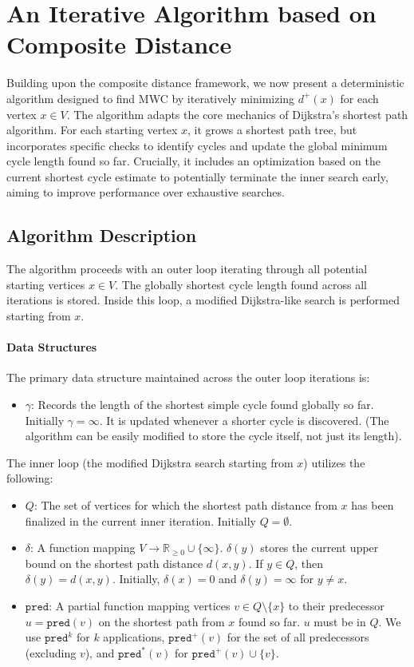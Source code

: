 \documentclass{article}
\begin{document}
\section{An Iterative Algorithm based on Composite Distance}
\label{sec_alg} %

Building upon the composite distance framework, we now present a deterministic algorithm designed to find MWC by iteratively minimizing $d^+(x)$ for each vertex $x \in V$. The algorithm adapts the core mechanics of Dijkstra's shortest path algorithm. For each starting vertex $x$, it grows a shortest path tree, but incorporates specific checks to identify cycles and update the global minimum cycle length found so far. Crucially, it includes an optimization based on the current shortest cycle estimate to potentially terminate the inner search early, aiming to improve performance over exhaustive searches.

\subsection{Algorithm Description}
\label{subsec:algo_desc}
The algorithm proceeds with an outer loop iterating through all potential starting vertices $x \in V$. The globally shortest cycle length found across all iterations is stored. Inside this loop, a modified Dijkstra-like search is performed starting from $x$.

\paragraph{Data Structures} The primary data structure maintained across the outer loop iterations is:
\begin{itemize}
    \item $\gamma$: Records the length of the shortest simple cycle found globally so far. Initially $\gamma = \infty$. It is updated whenever a shorter cycle is discovered. (The algorithm can be easily modified to store the cycle itself, not just its length).
\end{itemize}
The inner loop (the modified Dijkstra search starting from $x$) utilizes the following:
\begin{itemize}
    \item $Q$: The set of vertices for which the shortest path distance from $x$ has been finalized in the current inner iteration. Initially $Q = \emptyset$.
    \item $\delta$: A function mapping $V \to \mathbb{R}_{\ge 0} \cup \{\infty\}$. $\delta(y)$ stores the current upper bound on the shortest path distance $d(x,y)$. If $y \in Q$, then $\delta(y) = d(x,y)$. Initially, $\delta(x) = 0$ and $\delta(y) = \infty$ for $y \neq x$.
    \item $\texttt{pred}$: A partial function mapping vertices $v \in Q \setminus \{x\}$ to their predecessor $u = \texttt{pred}(v)$ on the shortest path from $x$ found so far. $u$ must be in $Q$. We use $\texttt{pred}^k$ for $k$ applications, $\texttt{pred}^+(v)$ for the set of all predecessors (excluding $v$), and $\texttt{pred}^*(v)$ for $\texttt{pred}^+(v) \cup \{v\}$.
\end{itemize}
\end{document}
